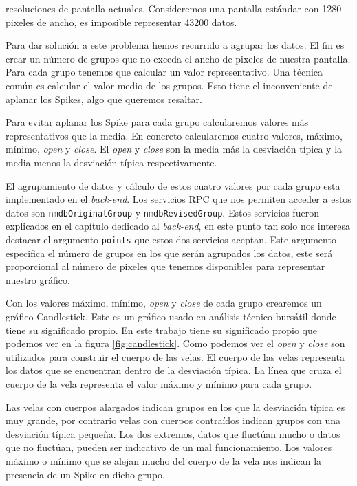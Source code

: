 		resoluciones de pantalla actuales. Consideremos una pantalla estándar con 1280 pixeles de ancho, es imposible representar 43200 datos.
		\par
		Para dar solución a este problema hemos recurrido a agrupar los datos. El fin es crear un número de grupos que no exceda el ancho de
		pixeles de nuestra pantalla. Para cada grupo tenemos que calcular un valor representativo. Una técnica común es calcular el valor
		medio de los grupos.  Esto tiene el inconveniente de aplanar los Spikes, algo que queremos resaltar.
		\par
		Para evitar aplanar los Spike para cada grupo calcularemos valores más representativos que la media. En concreto calcularemos cuatro
		valores, máximo, mínimo, \emph{open} y \emph{close}. El \emph{open} y \emph{close} son la media más la desviación típica y la media
		menos la desviación típica respectivamente.
		\par
		El agrupamiento de datos y cálculo de estos cuatro valores por cada grupo esta implementado en el \emph{back-end}. Los servicios RPC
		que nos permiten acceder a estos datos son \texttt{nmdbOriginalGroup} y \texttt{nmdbRevisedGroup}. Estos servicios fueron explicados
		en el capítulo dedicado al \emph{back-end}, en este punto tan solo nos interesa destacar el argumento \texttt{points} que estos dos
		servicios aceptan. Este argumento especifica el número de grupos en los que serán agrupados los datos, este será proporcional al
		número de pixeles que tenemos disponibles para representar nuestro gráfico. 
		\par
		Con los valores máximo, mínimo, \emph{open} y \emph{close} de cada grupo crearemos un gráfico Candlestick. Este es un gráfico usado en
		análisis técnico bursátil donde tiene su significado propio. En este trabajo tiene su significado propio que podemos ver en la figura
		\ref{fig:candlestick}. Como podemos ver el \emph{open} y \emph{close} son utilizados para construir el cuerpo de las velas. El cuerpo
		de las velas representa los datos que se encuentran dentro de la desviación típica. La línea que cruza el cuerpo de la vela representa
		el valor máximo y mínimo para cada grupo.
		\par
		Las velas con cuerpos alargados indican grupos en los que la desviación típica es muy grande, por contrario velas con cuerpos
		contraídos indican grupos con una desviación típica pequeña. Los dos extremos, datos que fluctúan mucho o datos que no fluctúan,
		pueden ser indicativo de un mal funcionamiento. Los valores máximo o mínimo que se alejan mucho del cuerpo de la vela nos indican la
		presencia de un Spike en dicho grupo. 	
